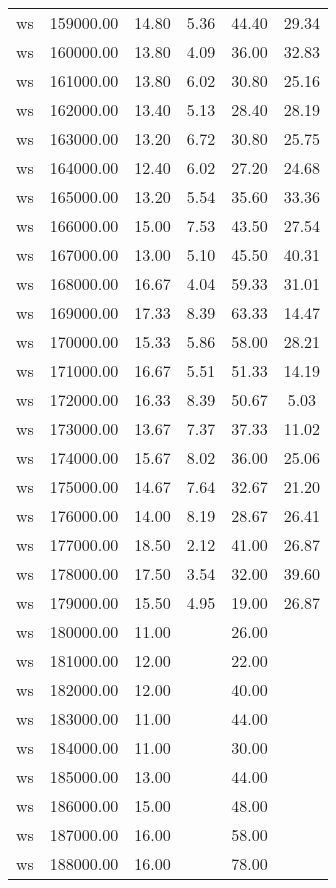 \begin{table}[ht]
\begin{table}[ht]
\begin{tabular}{|cccccc}
  ws & 159000.00 & 14.80 & 5.36 & 44.40 & 29.34 \\ 
  ws & 160000.00 & 13.80 & 4.09 & 36.00 & 32.83 \\ 
  ws & 161000.00 & 13.80 & 6.02 & 30.80 & 25.16 \\ 
  ws & 162000.00 & 13.40 & 5.13 & 28.40 & 28.19 \\ 
  ws & 163000.00 & 13.20 & 6.72 & 30.80 & 25.75 \\ 
  ws & 164000.00 & 12.40 & 6.02 & 27.20 & 24.68 \\ 
  ws & 165000.00 & 13.20 & 5.54 & 35.60 & 33.36 \\ 
  ws & 166000.00 & 15.00 & 7.53 & 43.50 & 27.54 \\ 
  ws & 167000.00 & 13.00 & 5.10 & 45.50 & 40.31 \\ 
  ws & 168000.00 & 16.67 & 4.04 & 59.33 & 31.01 \\ 
  ws & 169000.00 & 17.33 & 8.39 & 63.33 & 14.47 \\ 
  ws & 170000.00 & 15.33 & 5.86 & 58.00 & 28.21 \\ 
  ws & 171000.00 & 16.67 & 5.51 & 51.33 & 14.19 \\ 
  ws & 172000.00 & 16.33 & 8.39 & 50.67 & 5.03 \\ 
  ws & 173000.00 & 13.67 & 7.37 & 37.33 & 11.02 \\ 
  ws & 174000.00 & 15.67 & 8.02 & 36.00 & 25.06 \\ 
  ws & 175000.00 & 14.67 & 7.64 & 32.67 & 21.20 \\ 
  ws & 176000.00 & 14.00 & 8.19 & 28.67 & 26.41 \\ 
  ws & 177000.00 & 18.50 & 2.12 & 41.00 & 26.87 \\ 
  ws & 178000.00 & 17.50 & 3.54 & 32.00 & 39.60 \\ 
  ws & 179000.00 & 15.50 & 4.95 & 19.00 & 26.87 \\ 
  ws & 180000.00 & 11.00 &  & 26.00 &  \\ 
  ws & 181000.00 & 12.00 &  & 22.00 &  \\ 
  ws & 182000.00 & 12.00 &  & 40.00 &  \\ 
  ws & 183000.00 & 11.00 &  & 44.00 &  \\ 
  ws & 184000.00 & 11.00 &  & 30.00 &  \\ 
  ws & 185000.00 & 13.00 &  & 44.00 &  \\ 
  ws & 186000.00 & 15.00 &  & 48.00 &  \\ 
  ws & 187000.00 & 16.00 &  & 58.00 &  \\ 
  ws & 188000.00 & 16.00 &  & 78.00 &  \\ 

\end{tabular}
\end{table}
\end{table}
